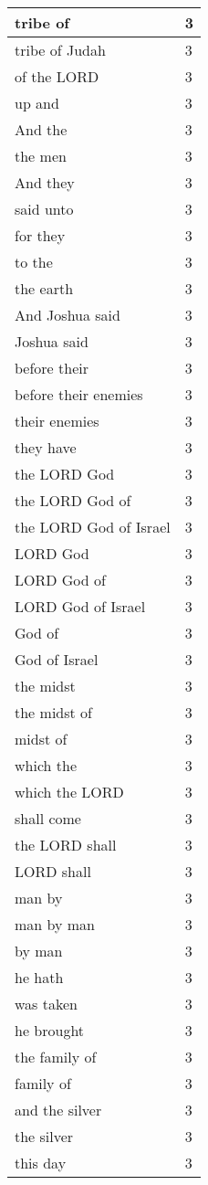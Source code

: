 \begin{center}
\begin{longtable}{|p{3.0in}|p{0.5in}|}
tribe of & 3\\ \hline 
tribe of Judah & 3\\ \hline 
of the LORD & 3\\ \hline 
up and & 3\\ \hline 
And the & 3\\ \hline 
the men & 3\\ \hline 
And they & 3\\ \hline 
said unto & 3\\ \hline 
for they & 3\\ \hline 
to the & 3\\ \hline 
the earth & 3\\ \hline 
And Joshua said & 3\\ \hline 
Joshua said & 3\\ \hline 
before their & 3\\ \hline 
before their enemies & 3\\ \hline 
their enemies & 3\\ \hline 
they have & 3\\ \hline 
the LORD God & 3\\ \hline 
the LORD God of & 3\\ \hline 
the LORD God of Israel & 3\\ \hline 
LORD God & 3\\ \hline 
LORD God of & 3\\ \hline 
LORD God of Israel & 3\\ \hline 
God of & 3\\ \hline 
God of Israel & 3\\ \hline 
the midst & 3\\ \hline 
the midst of & 3\\ \hline 
midst of & 3\\ \hline 
which the & 3\\ \hline 
which the LORD & 3\\ \hline 
shall come & 3\\ \hline 
the LORD shall & 3\\ \hline 
LORD shall & 3\\ \hline 
man by & 3\\ \hline 
man by man & 3\\ \hline 
by man & 3\\ \hline 
he hath & 3\\ \hline 
was taken & 3\\ \hline 
he brought & 3\\ \hline 
the family of & 3\\ \hline 
family of & 3\\ \hline 
and the silver & 3\\ \hline 
the silver & 3\\ \hline 
this day & 3\\ \hline 
\end{longtable}
\end{center}





